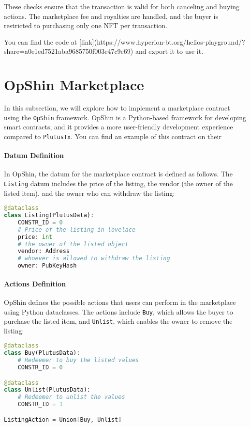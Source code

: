 These checks ensure that the transaction is valid for both canceling and buying actions. The marketplace fee and royalties are handled, and the buyer is restricted to purchasing only one NFT per transaction.

You can find the code at [link](https://www.hyperion-bt.org/helios-playground/?share=a0e1ed7521aba9685750f003c47c9c69) and export it to use it.

\section{OpShin Marketplace}

In this subsection, we will explore how to implement a marketplace contract using the \texttt{OpShin} framework. OpShin is a Python-based framework for developing smart contracts, and it provides a more user-friendly development experience compared to \texttt{PlutusTx}. You can find an example of this contract on their
\paragraph{Datum Definition}
In OpShin, the datum for the marketplace contract is defined as follows. The \texttt{Listing} datum includes the price of the listing, the vendor (the owner of the listed item), and the owner who can withdraw the listing:

\begin{lstlisting}[language=python, caption=Datum Definition in OpShin]
@dataclass
class Listing(PlutusData):
    CONSTR_ID = 0
    # Price of the listing in lovelace
    price: int
    # the owner of the listed object
    vendor: Address
    # whoever is allowed to withdraw the listing
    owner: PubKeyHash
\end{lstlisting}

\paragraph{Actions Definition}
OpShin defines the possible actions that users can perform in the marketplace using Python dataclasses. The actions include \texttt{Buy}, which allows the buyer to purchase the listed item, and \texttt{Unlist}, which enables the owner to remove the listing:

\begin{lstlisting}[language=python, caption=Actions Definition in OpShin]
@dataclass
class Buy(PlutusData):
    # Redeemer to buy the listed values
    CONSTR_ID = 0

@dataclass
class Unlist(PlutusData):
    # Redeemer to unlist the values
    CONSTR_ID = 1

ListingAction = Union[Buy, Unlist]
\end{lstlisting}

